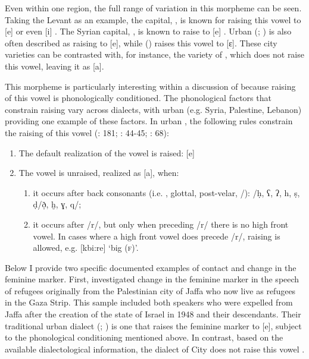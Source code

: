 \documentclass[output=paper]{langsci/langscibook}
\begin{document}
Even within one region, the full range of variation in this morpheme can be seen. Taking the Levant as an example, the  capital, , is known for raising this vowel to [e] or even [i] \citep{Naïm2011}. The Syrian capital, , is known to raise to [e] \citep{Lentin2011Damascus}. Urban  (\citealt{Rosenhouse2011}; \citealt{Shahin2011}) is also often described as raising to [e], while  (\citealt{Al-Wer2007}) raises this vowel to [ɛ]. These city varieties can be contrasted with, for instance, the variety of  \citep{Woidich2011}, which does not raise this vowel, leaving it as [a]. 

  This morpheme is particularly interesting within a discussion of  because raising of this vowel is phonologically conditioned. The phonological factors that constrain raising vary across dialects, with urban   (e.g. Syria, Palestine, Lebanon) providing one example of these factors. In urban , the following rules constrain the raising of this vowel (\citealt{Grotzfeld1980}: 181; \citealt{Levin1994}: 44-45; \citealt{Al-Wer2007}: 68):
\begin{enumerate}
    \item The default realization of the vowel is raised: [e]
    \item The vowel is unraised, realized as [a], when:
    \begin{enumerate}
        \item   it occurs after back consonants (i.e. , glottal, post-velar, /): /ḥ, ʕ, ʔ, h, ṣ, ḍ/ð̣, ḫ, ɣ, q/;
        \item   it occurs after /r/, but only when preceding /r/ there is no   high front vowel. In cases where a high front vowel does   precede /r/, raising is allowed, e.g. [kbi:re] ‘big (\textsc{f})’.
    \end{enumerate}
\end{enumerate}

Below I provide two specific documented examples of contact and change in the feminine  marker. First, \citet{CotterHoresh2015} investigated change in the feminine  marker in the speech of refugees originally from the Palestinian city of Jaffa who now live as refugees in the Gaza Strip. This sample included both speakers who were expelled from Jaffa after the creation of the state of Israel in 1948 and their descendants. Their traditional urban  dialect (\citealt{Horesh2000}; \citealt{Shahin2011}) is one that raises the feminine  marker to [e], subject to the phonological conditioning mentioned above. In contrast, based on the available dialectological information, the dialect of  City does not raise this vowel \citep{Bergsträßer1915}. 
\end{document}
